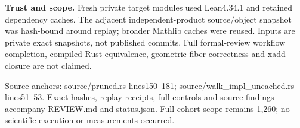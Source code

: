 \documentclass[11pt]{article}
\begin{document}
\textbf{Trust and scope.} Fresh private target modules used Lean4.34.1 and retained dependency caches. The adjacent independent-product source/object snapshot was hash-bound around replay; broader Mathlib caches were reused. Inputs are private exact snapshots, not published commits. Full formal-review workflow completion, compiled Rust equivalence, geometric fiber correctness and xadd closure are not claimed.

Source anchors: source/pruned.rs lines150--181; source/walk\_impl\_uncached.rs lines51--53. Exact hashes, replay receipts, full controls and source findings accompany REVIEW.md and status.json. Full cohort scope remains 1,260; no scientific execution or measurements occurred.
\end{document}
